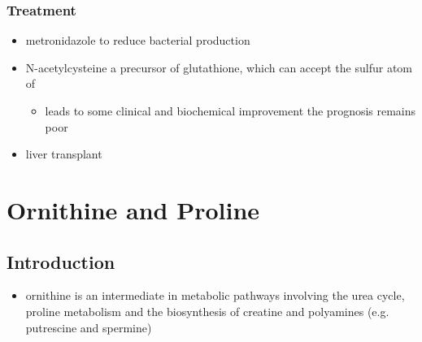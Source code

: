 \documentclass{scrartcl}
\begin{document}
\subsubsection{Treatment}
\label{sec:org175b38a}
\begin{itemize}
\item metronidazole to reduce bacterial  production
\item N-acetylcysteine a precursor of glutathione, which can accept the sulfur atom of 
\begin{itemize}
\item leads to some clinical and biochemical improvement the prognosis remains poor
\end{itemize}
\item liver transplant
\end{itemize}

\section{Ornithine and Proline}
\label{sec:orgaa71627}
\subsection{Introduction}
\label{sec:orgb0a915a}
\begin{itemize}
\item ornithine is an intermediate in metabolic pathways involving the
urea cycle, proline metabolism and the biosynthesis of creatine and
polyamines (e.g. putrescine and spermine)
\end{itemize}

\chemnameinit{}
\end{document}

